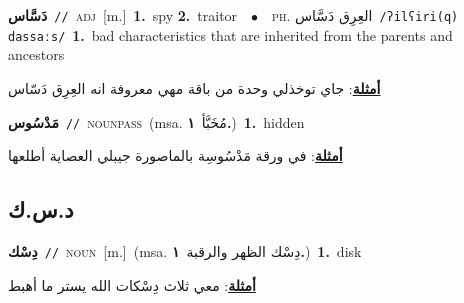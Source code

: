 \documentclass[10pt,a4paper,twoside]{article} %
\begin{document}
\begin{multicols}{2}
{\setlength\topsep{0pt}\textbf{\foreignlanguage{arabic}{دَسَّاس}}\ {\color{gray}\texttt{//}\color{black}}\ \textsc{adj}\ [m.]\ \textbf{1.}~spy  \textbf{2.}~traitor\ \ $\bullet$\ \ \textsc{ph.} \color{gray} \foreignlanguage{arabic}{العِرِق دَسَّاس}\color{black}\ {\color{gray}\texttt{/{\sffamily ʔilʕiri(q) dassaːs}/}\color{black}}\ \textbf{1.}~bad characteristics that are inherited from the parents and ancestors\  \begin{flushright}\color{gray}\foreignlanguage{arabic}{\textbf{\underline{\foreignlanguage{arabic}{أمثلة}}}: جاي توخذلي وحدة من باقة مهي معروفة انه العِرِق دَسّاس}\end{flushright}\color{black}} \vspace{2mm}

{\setlength\topsep{0pt}\textbf{\foreignlanguage{arabic}{مَدْسُوس}}\ {\color{gray}\texttt{//}\color{black}}\ \textsc{noun\textunderscore pass}\ \color{gray}(msa. \foreignlanguage{arabic}{مُخَبَّأ}~\foreignlanguage{arabic}{\textbf{١.}})\color{black}\ \textbf{1.}~hidden\  \begin{flushright}\color{gray}\foreignlanguage{arabic}{\textbf{\underline{\foreignlanguage{arabic}{أمثلة}}}: في ورقة مَدْسُوسِة بالماصورة جيبلي العصاية أطلعها}\end{flushright}\color{black}} \vspace{2mm}

\vspace{-3mm}
\subsection*{\color{blue}\foreignlanguage{arabic}{د.س.ك}\color{blue}{ (ntws)}} 

{\setlength\topsep{0pt}\textbf{\foreignlanguage{arabic}{دِسْك}}\ {\color{gray}\texttt{//}\color{black}}\ \textsc{noun}\ [m.]\ \color{gray}(msa. \foreignlanguage{arabic}{دِسْك الظهر والرقبة}~\foreignlanguage{arabic}{\textbf{١.}})\color{black}\ \textbf{1.}~disk\  \begin{flushright}\color{gray}\foreignlanguage{arabic}{\textbf{\underline{\foreignlanguage{arabic}{أمثلة}}}: معي ثلاث دِسْكات الله يستر ما أهبط}\end{flushright}\color{black}} \vspace{2mm}


\end{multicols}
\end{document}
